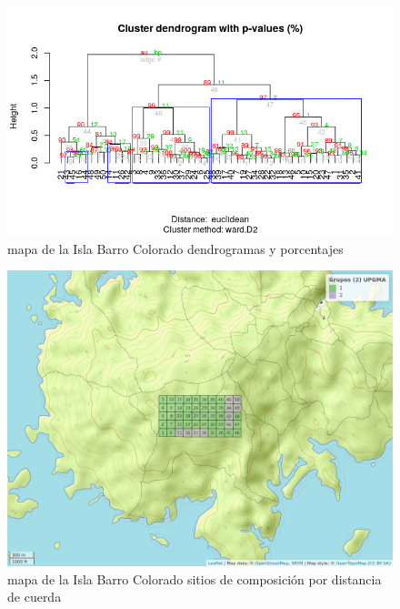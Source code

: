 \documentclass[11pt,]{article}
\begin{document}
\begin{figure}
\centering
\includegraphics[width=1.00000\textwidth]{agrupamiento_dendrogramas_porcentajes.png}
\caption{mapa de la Isla Barro Colorado dendrogramas y porcentajes
\label{fig:bci_map}}
\end{figure}

\begin{figure}
\centering
\includegraphics[width=1.00000\textwidth]{mapa_upgma_k2.png}
\caption{mapa de la Isla Barro Colorado sitios de composición por
distancia de cuerda \label{fig:bci_map}}
\end{figure}
\end{document}
